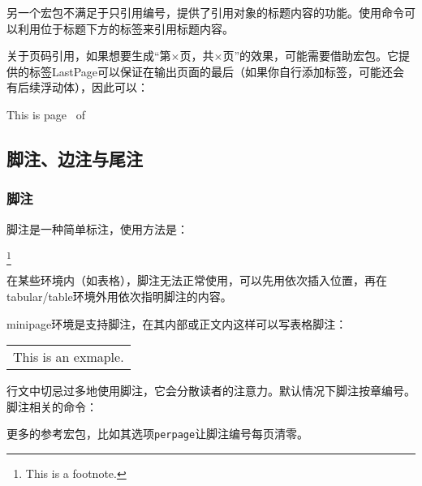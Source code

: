 另一个宏包不满足于只引用编号，提供了引用对象的标题内容的功能。使用命令可以利用位于标题下方的标签来引用标题内容。

关于页码引用，如果想要生成“第$\times$页，共$\times$页”的效果，可能需要借助宏包。它提供的标签LastPage可以保证在输出页面的最后（如果你自行添加标签，可能还会有后续浮动体），因此可以：

\begin{codeshow}
This is page \thepage\ of \pageref{LastPage}
\end{codeshow}

\subsection{脚注、边注与尾注}
\subsubsection{脚注}
脚注是一种简单标注，使用方法是：
\begin{latex}
\footnote{This is a footnote.}
\end{latex}

在某些环境内（如表格），脚注无法正常使用，可以先用依次插入位置，再在tabular/table环境外用依次指明脚注的内容。

minipage环境是支持脚注，在其内部或正文内这样可以写表格脚注：

\begin{codeshow}
\begin{minipage}{\linewidth}
\begin{tabular}{l}
This is an exmaple\footnotemark. 
\end{tabular}
\end{minipage}
\end{codeshow}

行文中切忌过多地使用脚注，它会分散读者的注意力。默认情况下脚注按章编号。脚注相关的命令：
\begin{latex}
\caption{Title\protect\footnote{This is footnote.}}
\renewcommand\footnoterule{\rule{0.4\columnwidth}{0.4pt}}
\setlength{\skip\footins}{0.5cm}
\end{latex}

更多的参考宏包，比如其选项\texttt{perpage}让脚注编号每页清零。

